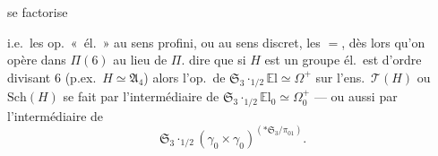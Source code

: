 \documentclass[11pt,a4paper]{article}
\begin{document}

se factorise 

i.e.\ les op.\ «~él.~» au sens profini, ou au sens discret,  les $=$, dès lors qu'on opère dans $\Pi(6)$ au lieu de $\Pi$.  dire que si $H$ est un groupe  él.\ est d'ordre divisant $6$ (p.ex.\ $H \simeq \mathfrak{A}_4$) alors l'op.\ de $\mathfrak{S}_3 \cdot_{1/2} \mathbb{E}\mathrm{l} \simeq \Omega^{+}$ sur l'ens.\ $\mathcal{T}(H)$ ou $\mathrm{Sch}(H)$ se fait par l'intermédiaire de $\mathfrak{S}_3 \cdot_{1/2} \mathbb{E}\mathrm{l}_0 \simeq \Omega_0^{+}$ --- ou aussi par l'intermédiaire de
\[
  \mathfrak{S}_3 \cdot_{1/2} (\gamma_0 \times \gamma_0)^{(*\mathfrak{S}_3/\pi_{01})} .
\]
\end{document}
